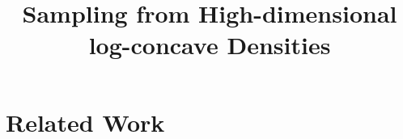 \documentclass[11pt]{article}
\title{Sampling from High-dimensional log-concave Densities}
\begin{document}
\maketitle

\section{Related Work} 

\newpage



\end{document}

